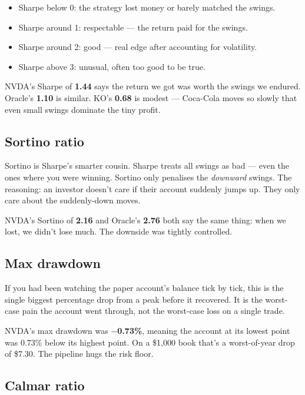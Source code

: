 \documentclass[11pt,a4paper]{article}
\begin{document}
\begin{itemize}
\item Sharpe below 0: the strategy lost money or barely matched the swings.
\item Sharpe around 1: respectable --- the return paid for the swings.
\item Sharpe around 2: good --- real edge after accounting for volatility.
\item Sharpe above 3: unusual, often too good to be true.
\end{itemize}

NVDA's Sharpe of \textbf{1.44} says the return we got was worth the swings
we endured. Oracle's \textbf{1.10} is similar. KO's \textbf{0.68} is
modest --- Coca-Cola moves so slowly that even small swings dominate the
tiny profit.

\subsection*{Sortino ratio}

Sortino is Sharpe's smarter cousin. Sharpe treats all swings as bad ---
even the ones where you were winning. Sortino only penalises the
\textit{downward} swings. The reasoning: an investor doesn't care if their
account suddenly jumps up. They only care about the suddenly-down moves.

NVDA's Sortino of \textbf{2.16} and Oracle's \textbf{2.76} both say the
same thing: when we lost, we didn't lose much. The downside was tightly
controlled.

\subsection*{Max drawdown}

If you had been watching the paper account's balance tick by tick, this
is the single biggest percentage drop from a peak before it recovered.
It is the worst-case pain the account went through, not the worst-case
loss on a single trade.

NVDA's max drawdown was \textbf{$-$0.73\%}, meaning the account at its
lowest point was 0.73\% below its highest point. On a \$1{,}000 book
that's a worst-of-year drop of \$7.30. The pipeline hugs the risk floor.

\subsection*{Calmar ratio}
\end{document}
